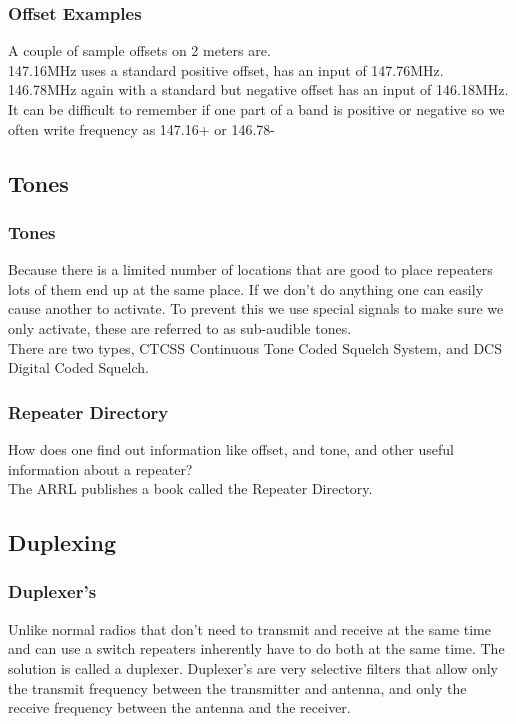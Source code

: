 \documentclass[10pt, handout]{beamer}
\begin{document}
\begin{frame}
\frametitle{Offset Examples}
A couple of sample offsets on 2 meters are.\\
147.16MHz uses a standard positive offset, has an input of 147.76MHz.\\
146.78MHz again with a standard but negative offset has an input of 146.18MHz.\\
It can be difficult to remember if one part of a band is positive or negative so we often write frequency as 147.16+ or 146.78-
\end{frame}

\subsection{Tones}

\begin{frame}
\frametitle{Tones}
Because there is a limited number of locations that are good to place repeaters lots of them end up at the same place. If we don't do anything one can easily cause another to activate. To prevent this we use special signals to make sure we only activate, these are referred to as sub-audible tones.\\

There are two types, CTCSS Continuous Tone Coded Squelch System, and DCS Digital Coded Squelch.
\end{frame}

\begin{frame}
\frametitle{Repeater Directory}
How does one find out information like offset, and tone, and other useful information about a repeater?\\
The ARRL publishes a book called the Repeater Directory.
\end{frame}

\subsection{Duplexing}

\begin{frame}
\frametitle{Duplexer's}
Unlike normal radios that don't need to transmit and receive at the same time and can use a switch repeaters inherently have to do both at the same time. The solution is called a duplexer. Duplexer's are very selective filters that allow only the transmit frequency between the transmitter and antenna, and only the receive frequency between the antenna and the receiver.
\end{frame}
\end{document}
